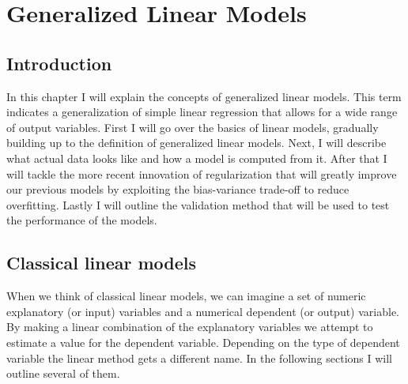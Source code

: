 \chapter{Generalized Linear Models}
\label{cha:glm}

\section{Introduction}
\label{sec:glm-introduction}
In this chapter I will explain the concepts of generalized linear models\cite{caltechmachinelearning}\cite{wikiglm}. This term indicates a generalization of simple linear regression that allows for a wide range of output variables. First I will go over the basics of linear models, gradually building up to the definition of generalized linear models. Next, I will describe what actual data looks like and how a model is computed from it. After that I will tackle the more recent innovation of regularization that will greatly improve our previous models by exploiting the bias-variance trade-off to reduce overfitting. Lastly I will outline the validation method that will be used to test the performance of the models.

\section{Classical linear models}
\label{sec:glm-classicallinearmodels}
When we think of classical linear models, we can imagine a set of numeric explanatory (or input) variables and a numerical dependent (or output) variable. By making a linear combination of the explanatory variables we attempt to estimate a value for the dependent variable. Depending on the type of dependent variable the linear method gets a different name. In the following sections I will outline several of them.

